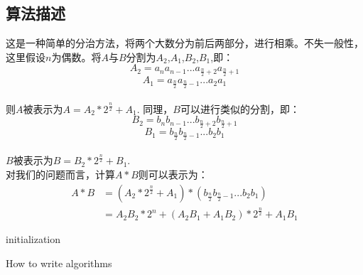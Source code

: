 \subsection{算法描述}
这是一种简单的分治方法，将两个大数分为前后两部分，进行相乘。不失一般性，这里假设$n$为偶数。将$A$与$B$分割为$A_2$,$A_1$,$B_2$,$B_1$,即：
\begin{displaymath}
    A_2 = a_{n} a_{n-1} ... a_{\frac{n}{2} + 2} a_{\frac{n}{2} + 1}
\end{displaymath}
\begin{displaymath}
    A_1 = a_{\frac{n}{2}} a_{\frac{n}{2} - 1} ... a_2 a_1
\end{displaymath}\\
则$A$被表示为$A = A_2 * 2^{\frac{n}{2}} + A_1$.
同理，$B$可以进行类似的分割，即：
\begin{displaymath}
    B_2 = b_{n} b_{n-1} ... b_{\frac{n}{2} + 2} b_{\frac{n}{2} + 1}
\end{displaymath}
\begin{displaymath}
    B_1 = b_{\frac{n}{2}} b_{\frac{n}{2} - 1} ... b_2 b_1
\end{displaymath}\\
$B$被表示为$B = B_2 * 2^{\frac{n}{2}} + B_1$.\\
对我们的问题而言，计算$A * B$则可以表示为：
\begin{displaymath}
    \begin{split}
        A * B
        & = (A_2 * 2^{\frac{n}{2}} + A_1) * (b_{\frac{n}{2}} b_{\frac{n}{2} - 1} ... b_2 b_1) \\
        & = A_2 B_2 * 2^n + (A_2 B_1 + A_1 B_2) * 2^{\frac{n}{2}} + A_1 B_1
    \end{split}
\end{displaymath}
\begin{algorithm}[H]
    \SetAlgoLined
    initialization\;
    \caption{How to write algorithms}
\end{algorithm}